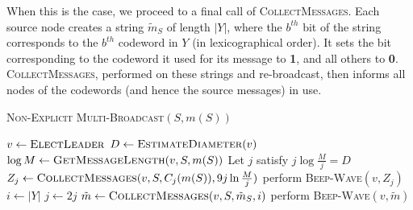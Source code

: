 \documentclass{article}
\begin{document}
When this is the case, we proceed to a final call of \textsc{CollectMessages}. Each source node creates a string $\tilde{m}_{S}$ of length $|Y|$, where the $b^{th}$ bit of the string corresponds to the $b^{th}$ codeword in $Y$ (in lexicographical order). It sets the bit corresponding to the codeword it used for its message to \textbf1, and all others to \textbf0. \textsc{CollectMessages}, performed on these strings and re-broadcast, then informs all nodes of the codewords (and hence the source messages) in use.


\begin{algorithm}[h]
	\caption{\textsc{Non-Explicit Multi-Broadcast}$(S,m(S))$}
	\label{alg:MB3}
	\begin{algorithmic}
		\State $v \gets \textsc{ElectLeader}$
		\State $D \gets \textsc{EstimateDiameter}(v)$
		\State $\log M \gets \textsc{GetMessageLength}(v,S,m(S))$
		\State Let $j$ satisfy $j\log \frac Mj = D$
		\Repeat 
		\State $Z_j \gets \textsc{CollectMessages}(v,S,C_j(m(S)), 9j\ln \frac {M}{j})$
		\State perform \textsc{Beep-Wave}$(v,Z_j)$
		\State $i \gets |Y|$
		\State $j\gets 2j$
		\State $\tilde{m} \gets \textsc{CollectMessages}(v,S,\tilde{m}_{S}, i)$
		\State perform \textsc{Beep-Wave}$(v,\tilde{m})$
	\end{algorithmic}
\end{algorithm}
\end{document}
